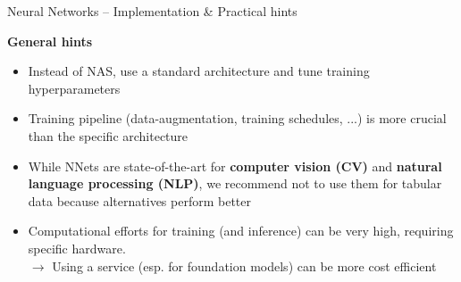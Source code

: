 \documentclass[11pt,compress,t,notes=noshow, xcolor=table]{beamer}
\newcommand{\highlight}[1]{\textcolor{hlcol}{\textbf{#1}}}
\begin{document}
\begin{frame2}
  {Neural Networks -- Implementation \& Practical hints}

\highlight{General hints}
\begin{itemize}
    \item Instead of NAS, use a standard architecture and tune training hyperparameters
    \item Training pipeline (data-augmentation, training schedules, ...) is more crucial than the specific architecture
    \item While NNets are state-of-the-art for \textbf{computer vision (CV)} and \textbf{natural language processing (NLP)}, we recommend not to use them for tabular data because alternatives perform better
    \item Computational efforts for training (and inference) can be very high, requiring specific hardware.\\
    $\rightarrow$ Using a service (esp. for foundation models) can be more cost efficient
\end{itemize}




\end{frame2}
\end{document}
